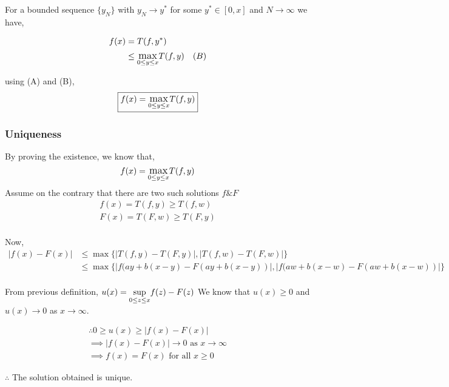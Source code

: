 For a bounded sequence $\{y_N\}$ with $y_N \rightarrow y^*$ for some $y^* \in [0, x]$ and $N \rightarrow \infty$ we have,

\begin{align*}
    f(x) &= T(f, y^*) \\
        &\le \mathlarger{\max}_{0 \le y \le x} T(f, y) & (B)\\
\end{align*}

using (A) and (B), 
$$
\boxed{f(x) = \mathlarger{\max}_{0 \le y \le x} T(f, y)}
$$

\subsubsection{Uniqueness}
By proving the existence, we know that,
$$f(x) = \mathlarger{\max}_{0 \le y \le x} T(f, y)$$
Assume on the contrary that there are two such solutions $f \& F$
\begin{align*}
    f(x) = T(f, y) \ge T(f, w)\\
    F(x) = T(F, w) \ge T(F, y)\\
\end{align*}

Now,
\begin{align*}
    |f(x) - F(x)| &\le \max\{|T(f, y) - T(F, y)|,|T(f, w) - T(F, w)|\}\\
                    &\le \max\{|f(ay+b(x-y) - F(ay+b(x-y))|,|f(aw+b(x-w) - F(aw+b(x-w))|\}\\
\end{align*}

From previous definition, $u(x) = \mathlarger{\sup}_{0 \le z \le x} f(z) - F(z)$
We know that $u(x) \ge 0$ and $u(x) \rightarrow 0$ as $x \rightarrow \infty$.

\begin{align*}
    \therefore 0 \ge u(x) \ge |f(x) - F(x)| \\
    \implies |f(x) - F(x)| \rightarrow 0 \text{ as } x \rightarrow \infty\\
    \implies f(x) = F(x) \text{ for all } x \ge 0
\end{align*}

$\therefore$ The solution obtained is unique.
